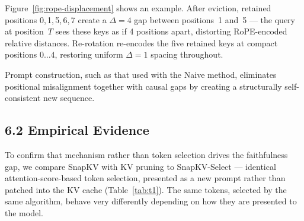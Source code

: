 \documentclass[10pt,letterpaper]{article}
\begin{document}
\begin{itemize}
Figure~\ref{fig:rope-displacement} shows an example.  After eviction, retained positions 0,\,1,\,5,\,6,\,7 create a $\Delta\!=\!4$ gap
between positions~1 and~5 --- the query at position~$T$ sees these keys as if 4 positions
apart, distorting RoPE-encoded relative distances. Re-rotation re-encodes the five retained
keys at compact positions $0\ldots4$, restoring uniform $\Delta\!=\!1$ spacing throughout.

Prompt construction, such as that used with the Naive method, eliminates positional misalignment
together with causal gaps by creating a structurally self-consistent new
sequence.

\end{itemize}
\hypertarget{empirical-evidence}{%
\subsection{6.2 Empirical Evidence}\label{empirical-evidence}}

To confirm that mechanism rather than token selection drives the
faithfulness gap, we compare SnapKV with KV pruning to SnapKV-Select ---
identical attention-score-based token selection, presented as a new
prompt rather than patched into the KV cache (Table~\ref{tab:t1}). The same tokens,
selected by the same algorithm, behave very differently depending on how
they are presented to the model. 
\end{document}
